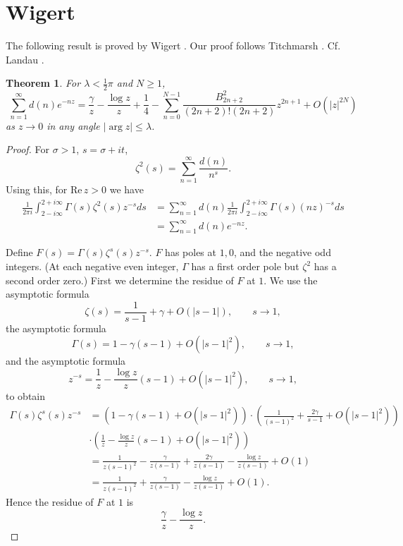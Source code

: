 \documentclass{article}
\def\Re{\ensuremath{\mathrm{Re}}\,}
\newtheorem{theorem}{Theorem}
\begin{document}
\section{Wigert}
The following result is proved by Wigert \cite{wigert}. Our proof follows Titchmarsh \cite[p.~163, Theorem 7.15]{zeta}. 
Cf. Landau  \cite{landau1918}.


\begin{theorem}
For $\lambda<\frac{1}{2}\pi$ and $N \geq 1$,
\[
\sum_{n=1}^\infty d(n) e^{-nz} = \frac{\gamma}{z}-\frac{\log z}{z}+\frac{1}{4}- \sum_{n=0}^{N-1} \frac{B_{2n+2}^2}{(2n+2)!(2n+2)} z^{2n+1}
+O(|z|^{2N})
\]
as $z \to 0$ in any angle $|\arg z| \leq \lambda$.
\label{wigert}
\end{theorem}
\begin{proof}
For $\sigma>1$, $s=\sigma+it$,
\[
\zeta^2(s) = \sum_{n=1}^\infty \frac{d(n)}{n^s}.
\]
Using this, for
 $\Re z>0$ we have
\begin{align}
\frac{1}{2\pi i}\int_{2-i\infty}^{2+i\infty}
\Gamma(s) \zeta^2(s) z^{-s} ds & = \sum_{n=1}^\infty d(n) \frac{1}{2\pi i} \int_{2-i\infty}^{2+i\infty}
\Gamma(s) (nz)^{-s} ds
\nonumber \\
& = \sum_{n=1}^\infty d(n) e^{-nz}.
\label{mellin}
\end{align}

Define $F(s) = \Gamma(s) \zeta^s(s) z^{-s}$. $F$ has poles at
$1,0$, and the negative odd integers. (At each negative even integer, $\Gamma$ has a first order pole but $\zeta^2$ has a second order
zero.) First we determine the residue of $F$ at $1$.
We use the asymptotic formula
\[
\zeta(s) = \frac{1}{s-1}+\gamma+O(|s-1|), \qquad s \to 1,
\]
the asymptotic formula
\[
\Gamma(s)=1-\gamma(s-1)+O(|s-1|^2), \qquad s \to 1,
\]
and  the asymptotic formula
\[
z^{-s} = \frac{1}{z}-\frac{\log z}{z} (s-1)+O(|s-1|^2), \qquad  s \to 1,
\]
to obtain
\begin{align*}
 \Gamma(s) \zeta^s(s) z^{-s} &=(1-\gamma(s-1)+O(|s-1|^2)  )
\cdot \left(\frac{1}{(s-1)^2}+\frac{2\gamma}{s-1}+O(|s-1|^2)\right)\\
&\cdot \left( \frac{1}{z}-\frac{\log z}{z} (s-1)+O(|s-1|^2) \right)\\
&=\frac{1}{z(s-1)^2}
-\frac{\gamma}{z(s-1)}+\frac{2\gamma}{z(s-1)}-\frac{\log z}{z(s-1)}+O(1)\\
&=\frac{1}{z(s-1)^2}+\frac{\gamma}{z(s-1)}-\frac{\log z}{z(s-1)}+O(1).
\end{align*}
Hence the residue of $F$ at $1$ is 
\[
\frac{\gamma}{z}-\frac{\log z}{z}.
\]


\end{proof}
\end{document}
